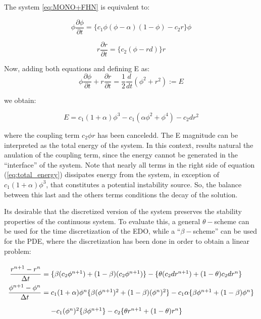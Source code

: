 The system \eqref{eq:MONO+FHN} is equivalent to:

\begin{equation} 
\phi \dfrac{\partial \phi}{ \partial t}  = \{ c_1 \phi (\phi - \alpha)(1 - \phi) - c_2 r \}\phi
\end{equation}

\begin{equation}
r \dfrac{\partial r}{\partial t}  = \{ c_2 (\phi - rd) \} r
\end{equation}

Now, adding both equations and defining E as:
\begin{equation}
\phi \dfrac{\partial \phi}{ \partial t} + r \dfrac{\partial r}{\partial t} = \frac{1}{2} \frac{d}{dt} \left(\phi^2 + r^2 \right):= E
\end{equation}

we obtain:

\begin{equation}
E = c_1 (1 + \alpha) \phi^3 - c_1 (\alpha \phi^2 +  \phi^4) -c_2 d r^2 \label{eq:total_energy}
\end{equation}

where the coupling term $c_2 \phi r$ has been canceledd. The E magnitude can be interpreted as the total energy of the system. In this context, results natural the anulation of the coupling term, since the energy cannot be generated in the ``interface'' of the system. Note that nearly all terms in the right side of equation (\ref{eq:total_energy}) dissipates energy from the system, in exception of $c_1 (1 + \alpha) \phi^3$, that constitutes a potential instability source. So, the balance between this last and the others terms conditions the decay of the solution.

Its desirable that the discretized version of the  system preserves the stability properties of the continuous system. To evaluate this, a general $\theta-$scheme can be used for the time discretization of the EDO, while a ``$\beta-$scheme'' can be used for the PDE, where the discretization has been done in order to obtain a linear problem:

\begin{equation}
\arraycolsep=1.4pt\def\arraystretch{2.2}
\begin{array}{rl}
\dfrac{r^{n+1}-r^n}{\Delta t} 
= &\{ \beta (c_2 \phi^{n + 1}) + (1 - \beta  )(c_2 \phi^{n + 1}) \} 
- \{ \theta  (c_2 d r^{n + 1}) + (1 - \theta )c_2 d r^{n} \} \\

\dfrac{\phi^{n+1} - \phi^n}{\Delta t}
= &c_1(1 + \alpha)\phi^n \{ \beta (\phi^{n+1})^2 + (1 - \beta) (\phi^{n})^2 \} 
- c_1 \alpha \{ \beta \phi^{n+1}  + (1 - \beta) \phi^n \} \\
&- c_1 (\phi^n)^2 \{ \beta \phi^{n+1} \} 
 - c_2 \{\theta r^{n+1} + (1 - \theta) r^{n} \}
\end{array} \label{eq:teta_esquema_MDE}
\end{equation}

